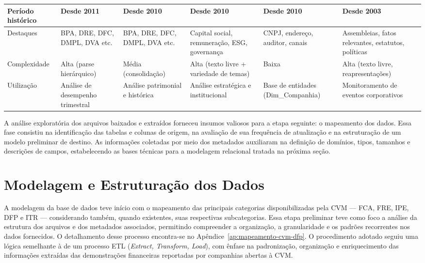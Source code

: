 \begin{board}[!htb]
\begin{varwidth}{\linewidth}
\begin{tabularx}{\textwidth}{|X|X|X|X|X|X|}
			Período histórico  & Desde 2011                        & Desde 2010                         & Desde 2010                                      & Desde 2010                         & Desde 2003                                           \\ \hline
			
			Destaques            & BPA, DRE, DFC, DMPL, DVA etc.     & BPA, DRE, DFC, DMPL, DVA etc.      & Capital social, remuneração, ESG, governança & CNPJ, endereço, auditor, canais   & Assembleias, fatos relevantes, estatutos, políticas \\ \hline
			
			Complexidade         & Alta (parse hierárquico)         & Média (consolidação)            & Alta (texto livre + variedade de temas)         & Baixa                              & Alta (texto livre, reapresentações)                \\ \hline
			
			Utilização         & Análise de desempenho trimestral & Análise patrimonial e histórica  & Análise estratégica e institucional           & Base de entidades (Dim\_Companhia) & Monitoramento de eventos corporativos                \\ \hline
		\end{tabularx}
	\end{varwidth}
\end{board}

A análise exploratória dos arquivos baixados e extraídos forneceu insumos valiosos para a etapa seguinte: o mapeamento dos dados. Essa fase consistiu na identificação das tabelas e colunas de origem, na avaliação de sua frequência de atualização e na estruturação de um modelo preliminar de destino. As informações coletadas por meio dos metadados auxiliaram na definição de domínios, tipos, tamanhos e descrições de campos, estabelecendo as bases técnicas para a modelagem relacional tratada na próxima seção.





\section{Modelagem e Estruturação dos Dados}\label{sec:modelagem}

A modelagem da base de dados teve início com o mapeamento das principais categorias disponibilizadas pela CVM — FCA, FRE, IPE, DFP e ITR — considerando também, quando existentes, suas respectivas subcategorias. Essa etapa preliminar teve como foco a análise da estrutura dos arquivos e dos metadados associados, permitindo compreender a organização, a granularidade e os padrões recorrentes nos dados fornecidos. O detalhamento desse processo encontra-se no Apêndice~\ref{ap:mapeamento-cvm-dfp}. O procedimento adotado seguiu uma lógica semelhante à de um processo ETL (\textit{Extract, Transform, Load}), com ênfase na padronização, organização e enriquecimento das informações extraídas das demonstrações financeiras reportadas por companhias abertas à CVM.

